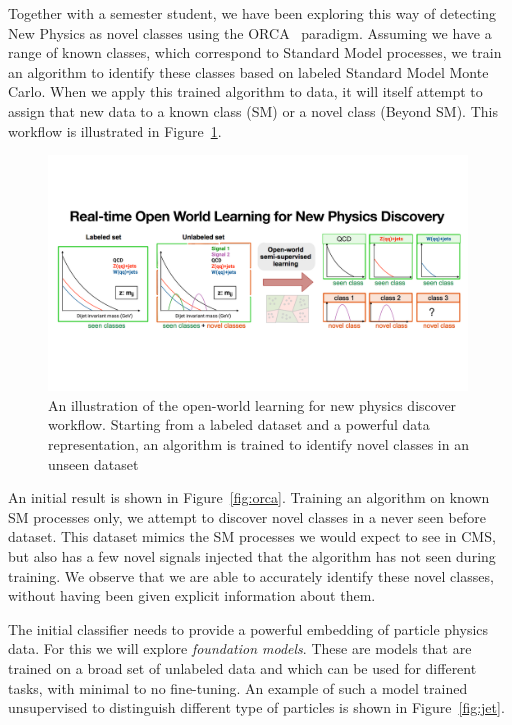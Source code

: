 \documentclass[12pt]{iopart}
\begin{document}
Together with a semester student, we have been exploring this way of detecting New Physics as novel classes using the ORCA~\cite{DBLP:journals/corr/abs-2102-03526} paradigm. Assuming we have a range of known classes, which correspond to Standard Model processes, we train an algorithm to identify these classes based on labeled Standard Model Monte Carlo. When we apply this trained algorithm to data, it will itself attempt to assign that new data to a known class (SM) or a novel class (Beyond SM). This workflow is illustrated in Figure~\ref{fig:ow}.
\begin{figure}[ht!]
    \centering
    \includegraphics[width=0.99\textwidth]{figures/ow_np.pdf}
    \caption{An illustration of the open-world learning for new physics discover workflow. Starting from a labeled dataset and a powerful data representation, an algorithm is trained to identify novel classes in an unseen dataset}
    \label{fig:ow}
\end{figure}

An initial result is shown in Figure~\ref{fig:orca}. Training an algorithm on known SM processes only, we attempt to discover novel classes in a never seen before dataset. This dataset mimics the SM processes we would expect to see in CMS, but also has a few novel signals injected that the algorithm has not seen during training. We observe that we are able to accurately identify these novel classes, without having been given explicit information about them.

The initial classifier needs to provide a powerful embedding of particle physics data. For this we will explore \textit{foundation models}. These are models that are trained on a broad set of unlabeled data and which can be used for different tasks, with minimal to no fine-tuning. An example of such a model trained unsupervised to distinguish different type of particles is shown in Figure~\ref{fig:jet}.
\end{document}
